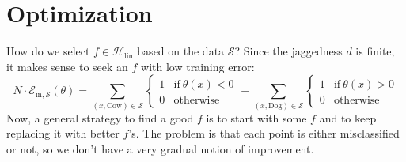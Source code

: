 \documentclass[openany, notitlepage, justified]{tufte-book}
\newcommand{\Ee}{\mathcal{E}}
\newcommand{\Hh}{\mathcal{H}}
\newcommand{\Ss}{\mathcal{S}}
\newcommand{\Ein}{\Ee_{\text{in},\Ss}}
\begin{document}
        \section{Optimization}
            How do we select $f\in \Hh_{\text{lin}}$ based on the data
            $\Ss$?  Since the jaggedness $d$ is finite, it makes sense to
            seek an $f$ with low training error:
            $$
                N \cdot \Ein(\theta) =
                    \sum_{(x,\text{Cow})\in \Ss}
                    \begin{cases} 
                        1       &       \text{if}~\theta(x) < 0 \\
                        0       &       \text{otherwise}
                    \end{cases}
                    + 
                    \sum_{(x,\text{Dog})\in \Ss}
                    \begin{cases} 
                        1       &       \text{if}~\theta(x) > 0 \\
                        0       &       \text{otherwise}
                    \end{cases}
            $$
            Now, a general strategy to find a good $f$ is to start with some
            $f$ and to keep replacing it with better $f$'s.
            The problem is that each point is either misclassified or not,
            so we don't have a very gradual notion of improvement.
\end{document}
